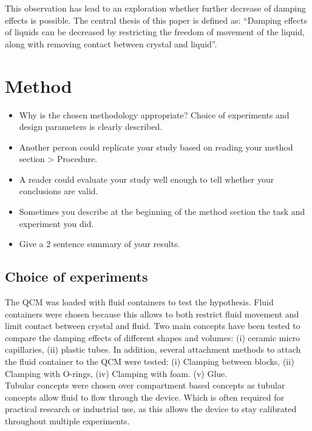 \documentclass[a4paper, 10pt, conference]{ieeeconf}      %
\begin{document}
    This observation has lead to an exploration whether further decrease of damping effects is possible. The central thesis of this paper is defined as: “Damping effects of liquids can be decreased by restricting the freedom of movement of the liquid, along with removing contact between crystal and liquid”.\\
\section{Method}
\begin{itemize}
  \item    Why is the chosen methodology appropriate? Choice of experiments and design parameters is clearly described. 
  \item    Another person could replicate your study based on reading your method section > Procedure. 
  \item    A reader could evaluate your study well enough to tell whether your conclusions are valid.
  \item    Sometimes you describe at the beginning of the method section the task and experiment you did. 
  \item    Give a 2 sentence summary of your results.
\end{itemize}

\subsection{Choice of experiments}
    The QCM was loaded with fluid containers to test the hypothesis. Fluid containers were chosen because this allows to both restrict fluid movement and limit contact between crystal and fluid. Two main concepts have been tested to compare the damping effects of different shapes and volumes: (i) ceramic micro capillaries, (ii) plastic tubes. In addition, several attachment methods to attach the fluid container to the QCM were tested: (i) Clamping between blocks, (ii) Clamping with O-rings, (iv) Clamping with foam. (v) Glue.\\

    Tubular concepts were chosen over compartment based concepts as tubular concepts allow fluid to flow through the device. Which is often required for practical research or industrial use, as this allows the device to stay calibrated throughout multiple experiments. \\
    
\end{document}
